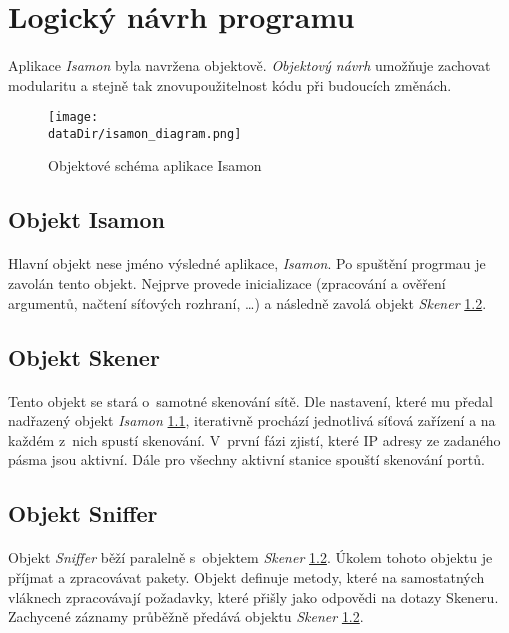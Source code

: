 \documentclass[a4paper,11pt,onecolumn,notitlepage]{article}
\def \dataDir {data}
\begin{document}
\section{Logický návrh programu}
\paragraph{} Aplikace \emph{Isamon} byla navržena objektově. \emph{Objektový návrh} umožňuje zachovat modularitu a stejně tak znovupoužitelnost kódu při budoucích změnách.
\begin{figure}[h]
    \centering
    \texttt{[image: \\dataDir/isamon\_diagram.png]}
    \caption{Objektové schéma aplikace Isamon\label{fig:ISAMON_DIAGRAM}}
\end{figure}
\subsection{Objekt Isamon}\label{fig:Isamon}
\paragraph{} Hlavní objekt nese jméno výsledné aplikace, \emph{Isamon}. Po spuštění progrmau je zavolán tento objekt. Nejprve provede inicializace (zpracování a ověření argumentů, načtení síťových rozhraní, \dots) a následně zavolá objekt \emph{Skener} \ref{fig:Skener}.
\subsection{Objekt Skener}\label{fig:Skener}
\paragraph{} Tento objekt se stará o~samotné skenování sítě. Dle nastavení, které mu předal nadřazený objekt \emph{Isamon} \ref{fig:Isamon}, iterativně prochází jednotlivá síťová zařízení a na každém z~nich spustí skenování. V~první fázi zjistí, které IP adresy ze zadaného pásma jsou aktivní. Dále pro všechny aktivní stanice spouští skenování portů.
\subsection{Objekt Sniffer}\label{fig:Sniffer}
\paragraph{} Objekt \emph{Sniffer} běží paralelně s~objektem \emph{Skener} \ref{fig:Skener}. Úkolem tohoto objektu je příjmat a zpracovávat pakety. Objekt definuje metody, které na samostatných vláknech zpracovávají požadavky, které přišly jako odpovědi na dotazy Skeneru. Zachycené záznamy průběžně předává objektu \emph{Skener} \ref{fig:Skener}.
\end{document}
